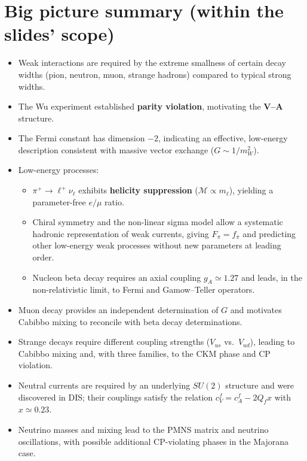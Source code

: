 \section{Big picture summary (within the slides' scope)}
\begin{itemize}
  \item Weak interactions are required by the extreme smallness of certain decay widths
        (pion, neutron, muon, strange hadrons) compared to typical strong widths.
  \item The Wu experiment established \textbf{parity violation}, motivating the \textbf{V--A} structure.
  \item The Fermi constant has dimension $-2$, indicating an effective, low-energy description
        consistent with massive vector exchange ($G\sim 1/m_W^2$).
  \item Low-energy processes:
        \begin{itemize}
          \item $\pi^+\to \ell^+\nu_\ell$ exhibits \textbf{helicity suppression} ($\mathcal{M}\propto m_\ell$),
                yielding a parameter-free $e/\mu$ ratio.
          \item Chiral symmetry and the non-linear sigma model allow a systematic hadronic representation
                of weak currents, giving $F_\pi=f_\pi$ and predicting other low-energy weak processes
                without new parameters at leading order.
          \item Nucleon beta decay requires an axial coupling $g_A\simeq 1.27$ and leads, in the non-relativistic limit,
                to Fermi and Gamow--Teller operators.
        \end{itemize}
  \item Muon decay provides an independent determination of $G$ and motivates Cabibbo mixing to reconcile
        with beta decay determinations.
  \item Strange decays require different coupling strengths ($V_{us}$ vs.\ $V_{ud}$), leading to Cabibbo mixing and,
        with three families, to the CKM phase and CP violation.
  \item Neutral currents are required by an underlying $SU(2)$ structure and were discovered in DIS;
        their couplings satisfy the relation $c_V^f=c_A^f-2Q_f x$ with $x\simeq 0.23$.
  \item Neutrino masses and mixing lead to the PMNS matrix and neutrino oscillations, with possible additional
        CP-violating phases in the Majorana case.
\end{itemize}